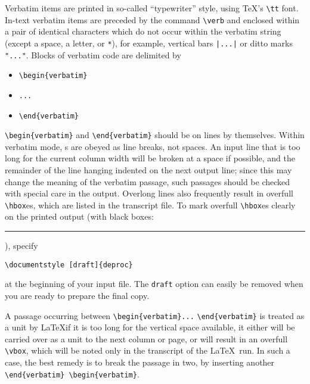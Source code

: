Verbatim items are printed in so-called ``typewriter'' style, using \TeX's
\verb"\tt" font.  In-text verbatim items are preceded by the command
\verb"\verb" and enclosed within a pair of identical characters which
do not occur within the verbatim string (except a space, a letter,
or \verb"*"), for example, vertical bars \verb"|...|" or ditto marks
\verb|"..."|.  Blocks of verbatim code are delimited by
\begin{itemize} \parskip=0pt \itemsep=0pt
\item[] \verb"\begin{verbatim}"
\item[] \verb"..."
\item[] \verb"\end{verbatim}"
\end{itemize}
\verb"\begin{verbatim}" and \verb"\end{verbatim}" should be on lines
by themselves.  Within verbatim
mode, \CR s are obeyed as line breaks, not spaces.  An input line that is too
long for the current column width will be broken at a space if possible,
and the remainder of the line hanging indented on the next output line;
since this may change the meaning of the verbatim passage, such passages
should be checked with special care in the output.  Overlong lines also
frequently result in overfull \verb"\hbox"es, which are listed in the
transcript file.  To mark overfull \verb"\hbox"es clearly on the printed
output (with black boxes: \rule{5pt}{\ht\strutbox}\thinspace), specify
\begin{verbatim}
\documentstyle [draft]{deproc}
\end{verbatim}
at the beginning of your input file.
The \verb"draft" option can easily be removed when you are ready to
prepare the final copy.

A passage occurring between \verb"\begin{verbatim}..."\allowhbreak
\verb"\end{verbatim}"
is treated as a unit by \LaTeX\Dash if it is too long for the vertical
space available, it either will be carried over as a unit to the next
column or page, or will result in an overfull \verb"\vbox", which will
be noted only in the transcript of the \LaTeX\ run.  In such a case,
the best remedy is to break the passage in two, by inserting another
\verb"\end{verbatim} \begin{verbatim}".


